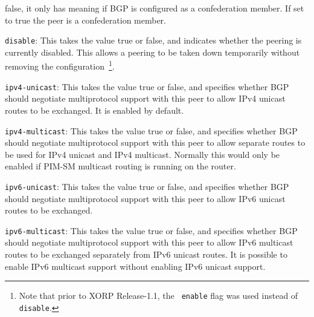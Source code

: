 \begin{description}
\begin{description}
{\stt false}, it only has meaning if BGP is configured as a
confederation member. If set to {\stt true} the peer is a
confederation member.
\item{\tt disable}: This takes the value {\stt true} or {\stt false},
  and indicates whether the peering is currently disabled.  This allows
  a peering to be taken down temporarily without removing the
  configuration~\footnote{Note that prior to XORP Release-1.1, the {\tt
  enable} flag was used instead of {\tt disable}.}.
\item{\tt ipv4-unicast}: This takes the value {\stt true} or {\stt false},
  and specifies whether BGP should
  negotiate multiprotocol support with this peer to allow IPv4 unicast
  routes to be exchanged. It is enabled by default.
\item{\tt ipv4-multicast}: This takes the value {\stt true} or {\stt false},
  and specifies whether BGP should
  negotiate multiprotocol support with this peer to allow separate
  routes to be used for IPv4 unicast and IPv4 multicast.  Normally
  this would only be enabled if PIM-SM multicast routing is running on
  the router.
\item{\tt ipv6-unicast}: This takes the value {\stt true} or {\stt false},
  and specifies whether BGP should
  negotiate multiprotocol support with this peer to allow IPv6 unicast
  routes to be exchanged.
\item{\tt ipv6-multicast}: This takes the value {\stt true} or {\stt false},
  and specifies whether BGP should
  negotiate multiprotocol support with this peer to allow IPv6
  multicast routes to be exchanged separately from IPv6 unicast
  routes.  It is possible to enable IPv6 multicast support without
  enabling IPv6 unicast support.
\end{description}
\end{description}

